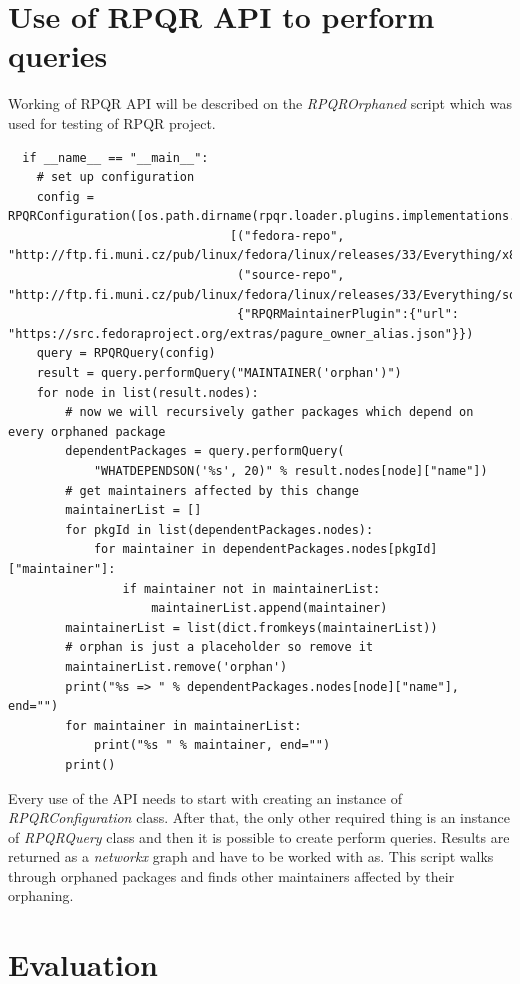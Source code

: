 \section{Use of RPQR API to perform queries}

Working of RPQR API will be described on the \textit{RPQROrphaned} script which was used for testing
of RPQR project.

\begin{lstlisting}
  if __name__ == "__main__":
    # set up configuration
    config = RPQRConfiguration([os.path.dirname(rpqr.loader.plugins.implementations.__file__)],
                               [("fedora-repo", "http://ftp.fi.muni.cz/pub/linux/fedora/linux/releases/33/Everything/x86_64/os/"),
                                ("source-repo", "http://ftp.fi.muni.cz/pub/linux/fedora/linux/releases/33/Everything/source/tree/")],
                                {"RPQRMaintainerPlugin":{"url": "https://src.fedoraproject.org/extras/pagure_owner_alias.json"}})
    query = RPQRQuery(config)
    result = query.performQuery("MAINTAINER('orphan')")
    for node in list(result.nodes):
        # now we will recursively gather packages which depend on every orphaned package
        dependentPackages = query.performQuery(
            "WHATDEPENDSON('%s', 20)" % result.nodes[node]["name"])
        # get maintainers affected by this change
        maintainerList = []
        for pkgId in list(dependentPackages.nodes):
            for maintainer in dependentPackages.nodes[pkgId]["maintainer"]:
                if maintainer not in maintainerList:
                    maintainerList.append(maintainer)
        maintainerList = list(dict.fromkeys(maintainerList))
        # orphan is just a placeholder so remove it
        maintainerList.remove('orphan')
        print("%s => " % dependentPackages.nodes[node]["name"], end="")
        for maintainer in maintainerList:
            print("%s " % maintainer, end="")
        print()
\end{lstlisting}

Every use of the API needs to start with creating an instance of \textit{RPQRConfiguration} class.
After that, the only other required thing is an instance of \textit{RPQRQuery} class and then it is
possible to create perform queries. Results are returned as a \textit{networkx} graph and have to be
worked with as. This script walks through orphaned packages and finds other maintainers affected by
their orphaning. 

\section{Evaluation}


